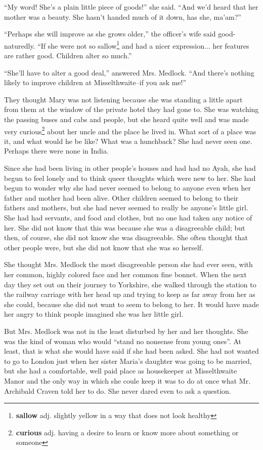 ``My word! She's a plain little piece of goods!'' she said. ``And we'd heard that her mother was a beauty. She hasn't handed much of it down, has she, ma'am?''

``Perhaps she will improve as she grows older,'' the officer's wife said good-naturedly. ``If she were not so sallow\footnote{\textbf{sallow} adj. slightly yellow in a way that does not look healthy} and had a nicer expression... her features are rather good. Children alter so much.''

``She'll have to alter a good deal,'' answered Mrs. Medlock. ``And there's nothing likely to improve children at Misselthwaite--if you ask me!''

They thought Mary was not listening because she was standing a little apart from them at the window of the private hotel they had gone to. She was watching the passing buses and cabs and people, but she heard quite well and was made very curious\footnote{\textbf{curious} adj. having a desire to learn or know more about something or someone} about her uncle and the place he lived in. What sort of a place was it, and what would he be like? What was a hunchback? She had never seen one. Perhaps there were none in India.

Since she had been living in other people's houses and had had no Ayah, she had begun to feel lonely and to think queer thoughts which were new to her. She had begun to wonder why she had never seemed to belong to anyone even when her father and mother had been alive. Other children seemed to belong to their fathers and mothers, but she had never seemed to really be anyone's little girl. She had had servants, and food and clothes, but no one had taken any notice of her. She did not know that this was because she was a disagreeable child; but then, of course, she did not know she was disagreeable. She often thought that other people were, but she did not know that she was so herself.

She thought Mrs. Medlock the most disagreeable person she had ever seen, with her common, highly colored face and her common fine bonnet. When the next day they set out on their journey to Yorkshire, she walked through the station to the railway carriage with her head up and trying to keep as far away from her as she could, because she did not want to seem to belong to her. It would have made her angry to think people imagined she was her little girl.

But Mrs. Medlock was not in the least disturbed by her and her thoughts. She was the kind of woman who would ``stand no nonsense from young ones''. At least, that is what she would have said if she had been asked. She had not wanted to go to London just when her sister Maria's daughter was going to be married, but she had a comfortable, well paid place as housekeeper at Misselthwaite Manor and the only way in which she coule keep it was to do at once what Mr. Archibald Craven told her to do. She never dared even to ask a question.

